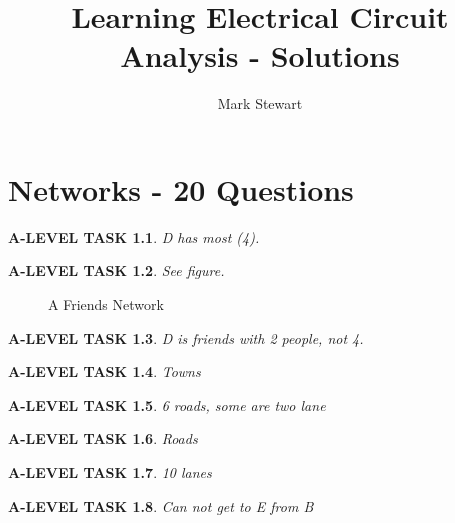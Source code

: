 \documentclass{book}
\numberwithin{equation}{section}
\newtheorem{alevel}{A-LEVEL TASK}
\theoremstyle{definition}
\begin{document}
\title{Learning Electrical Circuit Analysis - Solutions}
\author{Mark Stewart}
\maketitle

\chapter{Networks - 20 Questions}

\begin{alevel}D has most (4).\end{alevel}

\begin{alevel}See figure.\end{alevel}

\begin{figure}[H]
\begin{center}
\caption{A Friends Network}
\label{F:1FN}
\end{center}
\end{figure}

\begin{alevel}D is friends with 2 people, not 4.\end{alevel}

\begin{alevel}Towns\end{alevel}

\begin{alevel}6 roads, some are two lane\end{alevel}

\begin{alevel}Roads\end{alevel}

\begin{alevel}10 lanes\end{alevel}

\begin{alevel}Can not get to E from B\end{alevel}
\end{document}
